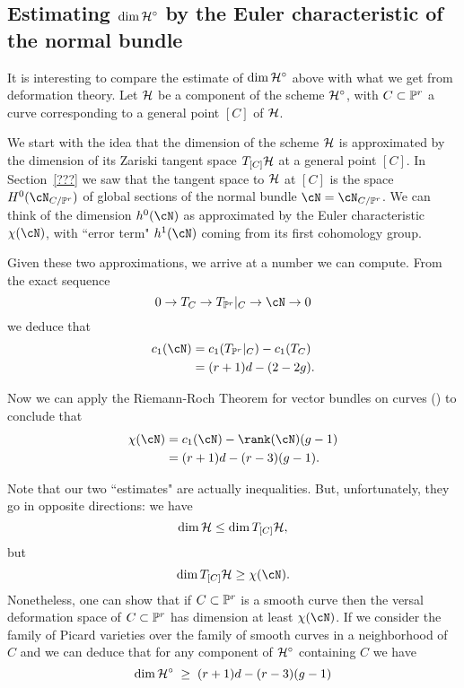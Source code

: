 
\subsection{Estimating $\dim \cH^\circ$ by the Euler characteristic of the normal bundle}

It is interesting to compare the estimate of  $\dim \cH^\circ$ above with what we get from deformation theory. Let $\cH$ be a component of the scheme $\cH^\circ$, with $C \subset \PP^r$ a curve corresponding to a general point $[C]$ of $\cH$.

We start with the idea that the dimension of the scheme $\cH$ is approximated by the dimension of its Zariski tangent space $T_{[C]}\cH$ at a general point $[C]$. In Section~\ref{???} we saw that the tangent space to $\cH$ at $[C]$ is the space $H^0(\cN_{C/\PP^r})$ of global sections of the normal bundle $\cN = \cN_{C/\PP^r}$. We can think of the dimension $h^0(\cN)$ as approximated by the Euler characteristic $\chi(\cN)$, with ``error term" $h^1(\cN)$ coming from its first cohomology group.

Given these two approximations, we arrive at a number we can  compute. From the exact sequence
$$
0 \to T_C \to T_{\PP^r}|_C \to \cN \to 0
$$
we deduce that
\begin{align*}
c_1(\cN) &= c_1(T_{\PP^r}|_C) - c_1(T_C) \\
&= (r+1)d - (2-2g).
\end{align*}

Now we can apply the Riemann-Roch Theorem for vector bundles on curves (\cite[Theorem ???]{3264}) to conclude that
\begin{align*}
\chi(\cN) &= c_1(\cN) - \rank(\cN)(g-1) \\
&= (r+1)d - (r-3)(g-1).
\end{align*}

Note that our two ``estimates" are actually inequalities. But, unfortunately, they go in opposite directions: we have
$$
\dim \cH \leq \dim T_{[C]}\cH,
$$
but 
$$
\dim T_{[C]}\cH \geq \chi(\cN).
$$
Nonetheless, one can show that if $C \subset \PP^r$ is a smooth curve then the versal deformation space of $C \subset \PP^r$ has dimension at least $\chi(\cN)$. If we consider the family of Picard varieties over the family of smooth curves in a neighborhood of $C$ and we can deduce that for any component of $\cH^\circ$ containing $C$ we have
$$
\dim \cH^\circ \; \geq \; (r+1)d - (r-3)(g-1)
$$

